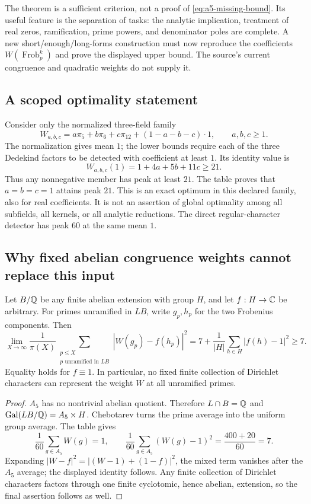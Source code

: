 The theorem is a sufficient criterion, not a proof of
\eqref{eq:a5-missing-bound}.  Its useful feature is the separation of tasks:
the analytic implication, treatment of real zeros, ramification, prime powers,
and denominator poles are complete.  A new short/enough/long-forms construction
must now reproduce the coefficients $W(\operatorname{Frob}_p^k)$ and prove
the displayed upper bound.  The source's current congruence and quadratic
weights do not supply it.

\subsection{A scoped optimality statement}

Consider only the normalized three-field family
\[
 W_{a,b,c}=a\pi_5+b\pi_6+c\pi_{12}+(1-a-b-c)\cdot1,
 \qquad a,b,c\geq1.
\]
The normalization gives mean $1$; the lower bounds require each of the three
Dedekind factors to be detected with coefficient at least $1$.  Its identity
value is
\[
 W_{a,b,c}(1)=1+4a+5b+11c\geq21.
\]
Thus any nonnegative member has peak at least $21$.  The table proves that
$a=b=c=1$ attains peak $21$.  This is an exact optimum in this declared family,
also for real coefficients.  It is not an assertion of global optimality
among all subfields, all kernels, or all analytic reductions.  The direct
regular-character detector has peak $60$ at the same mean $1$.

\subsection{Why fixed abelian congruence weights cannot replace this input}

\begin{theorem}
\label{thm:a5-blindness}
Let $B/\mathbb Q$ be any finite abelian extension with group $H$, and let
$f:H\to\mathbb C$ be arbitrary.  For primes unramified in $LB$, write $g_p,h_p$
for the two Frobenius components.  Then
\[
 \lim_{X\to\infty}\frac1{\pi(X)}
 \sum_{\substack{p\leq X\\p\text{ unramified in }LB}}
 |W(g_p)-f(h_p)|^2
 =7+\frac1{|H|}\sum_{h\in H}|f(h)-1|^2\geq7.
\]
Equality holds for $f\equiv1$.  In particular, no fixed finite collection of
Dirichlet characters can represent the weight $W$ at all unramified primes.
\end{theorem}

\begin{proof}
$A_5$ has no nontrivial abelian quotient.  Therefore $L\cap B=\mathbb Q$ and
$\operatorname{Gal}(LB/\mathbb Q)=A_5\times H$.  Chebotarev turns the prime average
into the uniform group average.  The table gives
\[
 \frac1{60}\sum_{g\in A_5}W(g)=1,
 \qquad
 \frac1{60}\sum_{g\in A_5}(W(g)-1)^2
 =\frac{400+20}{60}=7.
\]
Expanding $|W-f|^2=|(W-1)+(1-f)|^2$, the mixed term vanishes after the
$A_5$ average; the displayed identity follows.  Any finite collection of
Dirichlet characters factors through one finite cyclotomic, hence abelian,
extension, so the final assertion follows as well.
\end{proof}

